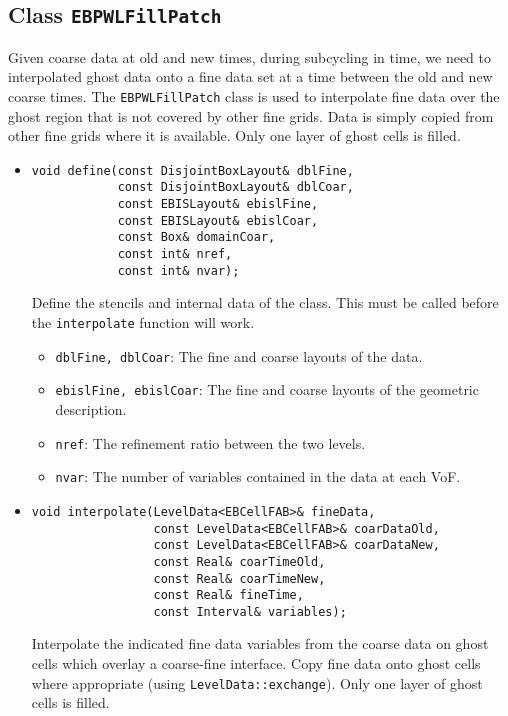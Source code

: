 \subsection{Class {\tt EBPWLFillPatch}}

Given coarse data at old and new times, during subcycling
in time, we need to interpolated ghost data onto  a fine
data set at a time between the old and new coarse times.
The {\tt EBPWLFillPatch}  class is used to interpolate
fine data over the ghost region that is not covered
by other fine grids.   Data is simply copied from other
fine grids where it is available.  Only one layer
of ghost cells is filled.
\begin{itemize}
\item \begin{small}\begin{verbatim}
void define(const DisjointBoxLayout& dblFine,
            const DisjointBoxLayout& dblCoar,
            const EBISLayout& ebislFine,
            const EBISLayout& ebislCoar,
            const Box& domainCoar,
            const int& nref,
            const int& nvar);        
\end{verbatim}\end{small}
Define the stencils and internal data of the class.  This
must be called before the {\tt interpolate} function will work. 

\begin{itemize}
\item {\tt dblFine, dblCoar}: The fine and coarse layouts
        of the data.
\item {\tt ebislFine, ebislCoar}: The fine and coarse layouts
        of the geometric description.
\item {\tt nref}: The refinement ratio between the two levels.
\item {\tt nvar}: The number of variables contained in the data
        at each VoF.
\end{itemize}

\item \begin{small}\begin{verbatim}
void interpolate(LevelData<EBCellFAB>& fineData,
                 const LevelData<EBCellFAB>& coarDataOld,
                 const LevelData<EBCellFAB>& coarDataNew,
                 const Real& coarTimeOld,
                 const Real& coarTimeNew,
                 const Real& fineTime,
                 const Interval& variables);
\end{verbatim}\end{small}
Interpolate the indicated fine data variables 
from the coarse data on ghost cells which overlay
a coarse-fine interface.  Copy fine data onto
ghost cells where appropriate (using \verb/LevelData::exchange/). 
Only one layer of ghost cells is filled.


\end{itemize}
